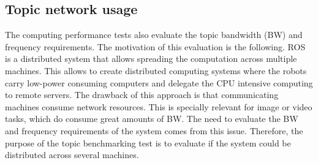 


		\subsection{Topic network usage}

		The computing performance tests also evaluate the topic bandwidth (BW) and frequency requirements. 
		The motivation of this evaluation is the following.
		ROS is a distributed system that allows spreading the computation across multiple machines. 
		This allows to create distributed computing systems where the robots carry low-power consuming computers and delegate the CPU intensive computing to remote servers.	
		The drawback of this approach is that communicating machines consume network resources. 
		This is specially relevant for image or video tasks, which do consume great amounts of BW. 
		The need to evaluate the BW and frequency requirements of the system comes from this issue. 
		Therefore, the purpose of the topic benchmarking test is to evaluate if the system could be distributed across several machines.

	

